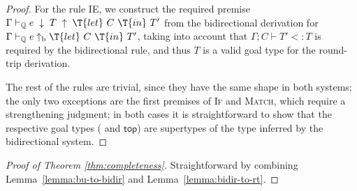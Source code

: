 \documentclass[10pt,preprint]{sigplanconf-pldi16}
\theoremstyle{definition}
\newcommand{\Subt}{<:}
\newcommand{\env}{\Gamma}
\newcommand{\produce}{\;\uparrow\;}
\newcommand{\consume}{\;\downarrow\;}
\newcommand{\produceB}{\;{\mathrm{\uparrow_b}}\;}
\newcommand{\ttop}{\mathsf{top}}
\newcommand{\contT}[2]{\T{let}\ {#1}\ \T{in}\ {#2}}
\newcommand{\quals}{\mathbb{Q}}
\newcommand{\entailsQ}{\vdash_{\quals}}
\begin{document}
\begin{proof}
For the rule \textsc{IE}, 
we construct the required premise $\env \entailsQ e \consume T \produce \contT{C}{T'}$
from the bidirectional derivation for $\env \entailsQ e \produceB \contT{C}{T'}$,
taking into account that $\env;C\vdash T'\Subt T$ is required by the bidirectional rule,
and thus $T$ is a valid goal type for the round-trip derivation. 

The rest of the rules are trivial, since they have the same shape in both systems;
the only two exceptions are the first premises of \textsc{If} and \textsc{Match},
which require a strengthening judgment;
in both cases it is straightforward to show that the respective goal types ( and $\ttop$)
are supertypes of the type inferred by the bidirectional system.
\end{proof}

\begin{proof}[Proof of Theorem \ref{thm:completeness}]
Straightforward by combining Lemma~\ref{lemma:bu-to-bidir} and Lemma~\ref{lemma:bidir-to-rt}.
\end{proof}
\end{document}
